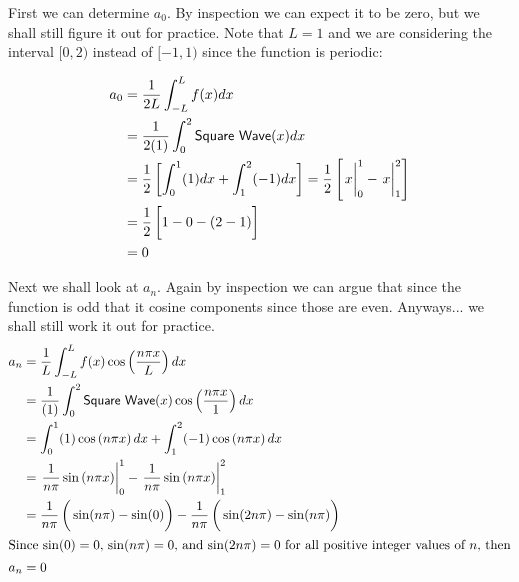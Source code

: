 \documentclass[10pt,letterpaper,twoside,final]{memoir}
\begin{document}
First we can determine $a_0$.  By inspection we can expect it to be zero, but we shall still 
figure it out for practice.  Note that $L = 1$ and we are considering the interval $[0, 2)$ instead
of $[-1, 1)$ since the function is periodic:
\begin{mathstuff}
\begin{align*}
a_0 &= \frac{1}{2L} \int_{-L}^L f(x) dx  \\
    &= \frac{1}{2(1)} \int_{0}^{2} \mathsf{Square\ Wave}(x) dx \\
    &= \frac{1}{2} \left[ \int_0^1 (1) dx + \int_1^2 (-1) dx \right] = \frac{1}{2} \left[ \left. \vphantom{\frac{1}{2}} x\right|^1_0 - \left. \vphantom{\frac{1}{2}} x\right|^2_1 \right] \\
    &= \frac{1}{2} \left[ \vphantom{\frac{1}{2}} 1 - 0 - (2 - 1) \right] \\
    &= 0
\end{align*}
\end{mathstuff}

\marginpar{\vspace{-4in}\emph{\lipsum[23-24]}}
\begin{mathbox}
Next we shall look at $a_n$.  Again by inspection we can argue that since the function is odd that it
cosine components since those are even.  Anyways... we shall still work it out for practice.
\begin{align*}
a_n &= \frac{1}{L}  \int_{-L}^L f(x) \cos \left( \frac{n\pi x}{L} \right) dx \\
    &= \frac{1}{(1)} \int_{0}^{2} \mathsf{Square\ Wave}(x)\cos \left( \frac{n\pi x}{1} \right) dx \\ 
    &= \int_0^1 (1) \cos \left( n\pi x \right) dx + \int_1^2 (-1) \cos \left( n\pi x \right) dx \\
    &= \left. \frac{1}{n \pi} \sin \left( n\pi x \right)\right|^1_0 -  \left. \frac{1}{n \pi} \sin \left( n\pi x \right)\right|^2_1 \\
    &= \frac{1}{n \pi} \left( \vphantom{\frac{1}{2}} \sin ( n\pi) - \sin(0) \right) - \frac{1}{n \pi} \left( \vphantom{\frac{1}{2}} \sin (2n\pi) - \sin(n\pi) \right) \\
\intertext{Since $\sin(0) = 0$, $\sin ( n\pi) = 0$, and $\sin (2n\pi) = 0$ for all positive integer values of $n$, then}
a_n &= 0
\end{align*}
\end{mathbox}
\end{document}
